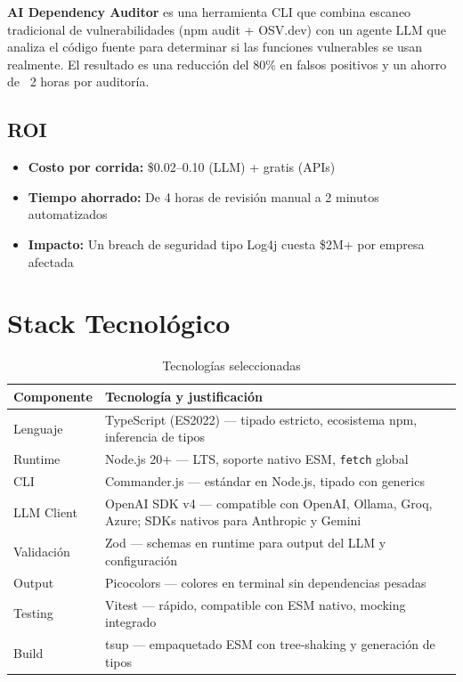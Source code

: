 \documentclass[11pt,a4paper]{article}
\begin{document}
\textbf{AI Dependency Auditor} es una herramienta CLI que combina escaneo tradicional de vulnerabilidades (npm audit + OSV.dev) con un agente LLM que analiza el código fuente para determinar si las funciones vulnerables se usan realmente. El resultado es una reducción del 80\% en falsos positivos y un ahorro de ~2 horas por auditoría.

\subsection{ROI}

\begin{itemize}
  \item \textbf{Costo por corrida:} \$0.02--0.10 (LLM) + gratis (APIs)
  \item \textbf{Tiempo ahorrado:} De 4 horas de revisión manual a 2 minutos automatizados
  \item \textbf{Impacto:} Un breach de seguridad tipo Log4j cuesta \$2M+ por empresa afectada
\end{itemize}

\section{Stack Tecnológico}

\begin{table}[H]
  \centering
  \caption{Tecnologías seleccionadas}
  \begin{tabularx}{\textwidth}{l X}
    \toprule
    \textbf{Componente} & \textbf{Tecnología y justificación} \\
    \midrule
    Lenguaje & TypeScript (ES2022) — tipado estricto, ecosistema npm, inferencia de tipos \\
    Runtime & Node.js 20+ — LTS, soporte nativo ESM, \texttt{fetch} global \\
    CLI & Commander.js — estándar en Node.js, tipado con generics \\
    LLM Client & OpenAI SDK v4 — compatible con OpenAI, Ollama, Groq, Azure; SDKs nativos para Anthropic y Gemini \\
    Validación & Zod — schemas en runtime para output del LLM y configuración \\
    Output & Picocolors — colores en terminal sin dependencias pesadas \\
    Testing & Vitest — rápido, compatible con ESM nativo, mocking integrado \\
    Build & tsup — empaquetado ESM con tree-shaking y generación de tipos \\
    \bottomrule
  \end{tabularx}
\end{table}
\end{document}
